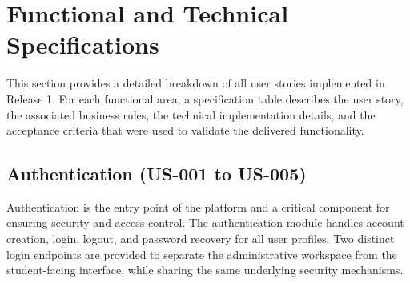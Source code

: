 \section{Functional and Technical Specifications}

This section provides a detailed breakdown of all user stories implemented in Release 1.
For each functional area, a specification table describes the user story, the associated
business rules, the technical implementation details, and the acceptance criteria that
were used to validate the delivered functionality.

\subsection{Authentication (US-001 to US-005)}

Authentication is the entry point of the platform and a critical component for ensuring
security and access control. The authentication module handles account creation,
login, logout, and password recovery for all user profiles. Two distinct login endpoints
are provided to separate the administrative workspace from the student-facing interface,
while sharing the same underlying security mechanisms.

